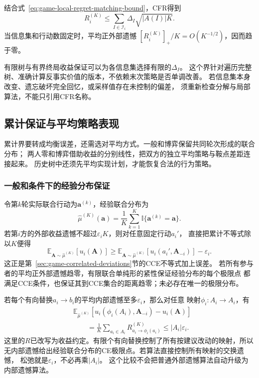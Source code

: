 结合式~\eqref{eq:game-local-regret-matching-bound}，CFR得到
\begin{equation}
  R_i^{(K)}
  \leq
  \sum_{I\in\mathcal{I}_i}
  \Delta_I\sqrt{|A(I)|K}.
  \label{eq:game-cfr-rate}
\end{equation}
当信息集和行动数固定时，平均正外部遗憾
\([R_i^{(K)}]_+/K=O(K^{-1/2})\)，因而趋于零。

有限树与有界终局收益保证可以为各信息集选择有限的\(\Delta_I\)。
这个界针对遍历完整树、准确计算反事实价值的版本，不依赖末次策略是否单调改善。
若信息集本身改变、遗忘破坏完全回忆，或采样值存在未控制的偏差，
须重新检查分解与局部算法，不能只引用CFR名称。

\subsection{累计保证与平均策略表现}
\label{sec:game-regret-average-guarantees}

累计界要转成均衡误差，还需选对平均方式。一般和博弈保留共同轮次形成的联合分布；
两人零和博弈借助收益的分别线性，把双方的独立平均策略与鞍点差距连接起来。
历史树中还须先平均实现计划，才能恢复合法的行为策略。

\subsubsection{一般和条件下的经验分布保证}
\label{sec:game-empirical-equilibrium}

令第\(k\)轮实际联合行动为\(\bm a^{(k)}\)，经验联合分布为
\[
  \widehat\mu^{(K)}(\bm a)
  =\frac1K\sum_{k=1}^K\mathbb I\{\bm a^{(k)}=\bm a\}.
\]
若第\(i\)方的外部收益遗憾不超过\(\varepsilon_iK\)，则对任意固定行动\(a_i'\)，
直接把累计不等式除以\(K\)便得
\[
  \mathbb E_{\bm A\sim\widehat\mu^{(K)}}[u_i(\bm A)]
  \geq
  \mathbb E_{\bm A\sim\widehat\mu^{(K)}}
     [u_i(a_i',\bm A_{-i})]-\varepsilon_i.
\]
这正是第~\ref{sec:game-correlated-deviations}节的CCE不等式加上误差。
若所有参与者的平均正外部遗憾趋零，有限联合单纯形的紧性保证经验分布的每个极限点
都满足CCE条件，也保证其到CCE集合的距离趋零；未必存在唯一的极限分布。

若每个有向替换\(a_i\to b_i\)的平均内部遗憾至多\(\varepsilon_i\)，那么对任意
映射\(\phi_i:A_i\to A_i\)，有
\[
  \begin{aligned}
    &\mathbb E_{\widehat\mu^{(K)}}[
       u_i(\phi_i(A_i),\bm A_{-i})-u_i(\bm A)]\\
    &\qquad=\frac1K\sum_{a_i\in A_i}R_{a_i\to\phi_i(a_i)}^{(K)}
      \leq |A_i|\varepsilon_i.
  \end{aligned}
\]
这里的\(R\)已改写为收益约定。有限个有向替换控制了所有按建议改动的映射，所以
无内部遗憾给出经验联合分布的CE极限点。若算法直接控制所有映射的交换遗憾，
松弛就是\(\varepsilon_i\)，不必再乘\(|A_i|\)。
这个比较不会把普通外部遗憾算法自动升级为内部遗憾算法。

